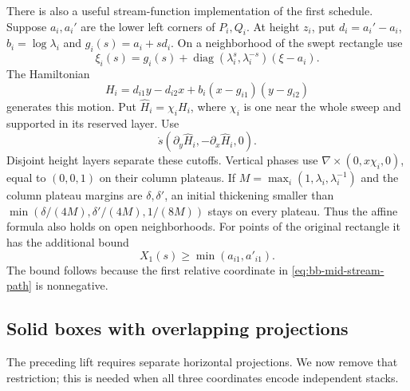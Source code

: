 There is also a useful stream-function implementation of the first
schedule.  Suppose $a_i,a_i'$ are the lower left corners of $P_i,Q_i$.
At height $z_i$, put $d_i=a_i'-a_i$, $b_i=\log\lambda_i$ and
$g_i(s)=a_i+sd_i$.  On a neighborhood of the swept rectangle use
\begin{equation}\label{eq:bb-mid-stream-path}
 \xi_i(s)=g_i(s)+\operatorname{diag}(\lambda_i^s,\lambda_i^{-s})(\xi-a_i).
\end{equation}
The Hamiltonian
\[
 H_i=d_{i1}y-d_{i2}x+b_i(x-g_{i1})(y-g_{i2})
\]
generates this motion. Put $\widehat H_i=\chi_iH_i$, where $\chi_i$
is one near the whole sweep and supported in its reserved layer. Use
\[
 \dot s(\partial_y\widehat H_i,-\partial_x\widehat H_i,0).
\]
Disjoint height layers separate these cutoffs.  Vertical phases use
$\nabla\times(0,x\chi_i,0)$, equal to $(0,0,1)$ on their column
plateaus.  If $M=\max_i(1,\lambda_i,\lambda_i^{-1})$ and the column
plateau margins are $\delta,\delta'$, an initial thickening smaller than
$\min(\delta/(4M),\delta'/(4M),1/(8M))$ stays on every plateau.
Thus the affine formula also holds on open neighborhoods. For points of
the original rectangle it has the additional bound
\begin{equation}\label{eq:bb-mid-stream-safe}
 X_1(s)\ge\min(a_{i1},a'_{i1}).
\end{equation}
The bound follows because the first relative coordinate in
\eqref{eq:bb-mid-stream-path} is nonnegative.

\subsection{Solid boxes with overlapping projections}

The preceding lift requires separate horizontal projections.  We now
remove that restriction; this is needed when all three coordinates
encode independent stacks.

